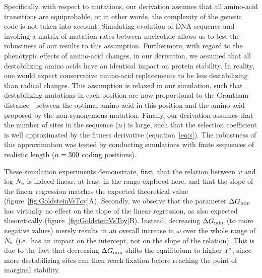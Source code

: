 \documentclass{article}
\begin{document}
Specifically, with respect to mutations, our derivation assumes that all amino-acid transitions are equiprobable, or in other words, the complexity of the genetic code is not taken into account.
Simulating evolution of {DNA} sequence and invoking a matrix of mutation rates between nucleotide allows us to test the robustness of our results to this assumption.
Furthermore, with regard to the phenotypic effects of amino-acid changes, in our derivation, we assumed that all destabilizing amino acids have an identical impact on protein stability.
In reality, one would expect conservative amino-acid replacements to be less destabilizing than radical changes.
This assumption is relaxed in our simulation, such that destabilizing mutations in each position are now proportional to the Grantham distance~\citep{Grantham1974} between the optimal amino acid in this position and the amino acid proposed by the {non-synonymous} mutation.
Finally, our derivation assumes that the number of sites in the sequence ($n$) is large, such that the selection coefficient is well approximated by the fitness derivative (equation~\ref{eq:s}).
The robustness of this approximation was tested by conducting simulations with finite sequences of realistic length ($n=300$ coding positions).

These simulation experiments demonstrate, first, that the relation between $\omega$ and log-$N_{\text{e}}$ is indeed linear, at least in the range explored here, and that the slope of the linear regression matches the expected theoretical value (figure~\ref{fig:GoldsteinVsToy}A).
Secondly, we observe that the parameter $\Delta G_{\text{min}}$ has virtually no effect on the slope of the linear regression, as also expected theoretically (figure~\ref{fig:GoldsteinVsToy}B).
Instead, decreasing $\Delta G_{\text{min}}$ (to more negative values) merely results in an overall increase in $\omega$ over the whole range of $N_{\text{e}}$ (i.e.~has an impact on the intercept, not on the slope of the relation).
This is due to the fact that decreasing $\Delta G_{\text{min}}$ shifts the equilibrium to higher $x^{*}$, since more destabilizing sites can then reach fixation before reaching the point of marginal stability.
\end{document}

